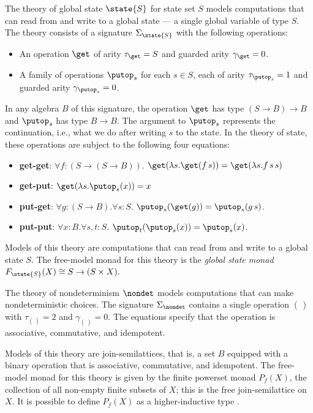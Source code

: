 \documentclass[acmsmall,screen,review,anonymous]{acmart}
\theoremstyle{remark}
\begin{document}
\begin{example}[State]\label{ex:state} %
    The theory of global state ${\state{S}}$ for state set $S$ models
    computations that can read from and write to a global state --- a single
    global variable of type $S$. The theory consists of a signature
    $\Sigma_{\state{S}}$ with the following operations:
    \begin{itemize}
        \item An operation $\get$ of arity $\tau_\get = S$ and guarded arity
        $\gamma_{\get} = 0$.
        \item A family of operations $\putop_s$ for each $s \in S$, each of arity
        $\tau_{\putop_s} = 1$ and guarded arity $\gamma_{\putop_s} = 0$.
    \end{itemize}
    
    In any algebra $B$ of this signature, the operation $\get$ has type $(S \to
    B) \to B$ and $\putop_s$ has type $B \to B$. The argument to $\putop_s$
    represents the continuation, i.e., what we do after writing $s$ to the
    state.
    In the theory of state, these operations are subject to the following four
    equations:
    \begin{itemize}
        \item \textbf{get-get}: $\forall f : (S \to (S \to B)).$
            $\get(\lambda s. \get (f\, s)) = \get(\lambda s. f\, s\, s)$
        \item \textbf{get-put}:
            $\get(\lambda s.\putop_s(x)) = x$
        \item \textbf{put-get}: $\forall g : (S \to B).\forall s : S.$
            $\putop_s(\get(g)) = \putop_s(g\, s)$.    
        \item \textbf{put-put}: $\forall x : B. \forall s, t : S.$
            $\putop_t(\putop_s(x)) = \putop_s(x)$.
    \end{itemize}
    Models of this theory are computations that can read from and write to a
    global state $S$.
    The free-model monad for this theory is the \emph{global state monad}
    $F_{\state{S}}(X) \cong S \to (S \times X).$

\end{example}

\begin{example}[Nondeterminism]\label{ex:nondeterminism}
  The theory of nondeterminism $\nondet$ models computations that can make
  nondeterministic choices. The signature $\Sigma_{\nondet}$ contains a single
  operation $\choose$ with $\tau_{\choose} = 2$ and $\gamma_{\choose} = 0$. The
  equations specify that the operation is associative, commutative, and
  idempotent.

  Models of this theory are join-semilattices, that is, a set $B$ equipped with
  a binary operation that is associative, commutative, and idempotent. The
  free-model monad for this theory is given by the finite powerset monad
  $P_f(X)$, the collection of all non-empty finite subsets of $X$; this is the
  free join-semilattice on $X$. It is possible to define $P_f(X)$ as a
  higher-inductive type \cite{10.1145/3167085, 10.3217/jucs-023-01-0063}.
\end{example}
\end{document}
